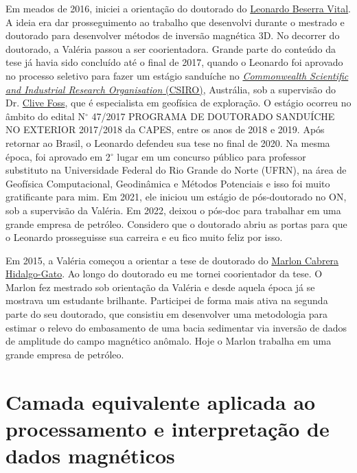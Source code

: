 Em meados de 2016, iniciei a orientação do doutorado do 
\href{https://lattes.cnpq.br/3155435296388448}{Leonardo Beserra Vital}.
A ideia era dar prosseguimento ao trabalho que desenvolvi durante o mestrado e doutorado
para desenvolver métodos de inversão magnética 3D.
No decorrer do doutorado, a Valéria passou a ser coorientadora.
Grande parte do conteúdo da tese já havia sido concluído até o final de 2017, quando
o Leonardo foi aprovado no processo seletivo para fazer um estágio sanduíche no 
\href{https://www.csiro.au/}{\textit{Commonwealth Scientific and Industrial Research Organisation} (CSIRO)}, Austrália, sob a supervisão do Dr.
\href{https://confluence.csiro.au/display/cmfr/CSIRO+Remanent+Magnetists}{Clive Foss}, 
que é especialista em geofísica de exploração. O estágio ocorreu no âmbito do edital
N$^{\circ}$ 47/2017 PROGRAMA DE DOUTORADO SANDUÍCHE NO EXTERIOR 2017/2018 da CAPES, 
entre os anos de 2018 e 2019. Após retornar ao Brasil, o Leonardo defendeu sua tese
no final de 2020. Na mesma época, foi aprovado em 2$^{\circ}$ lugar em um concurso 
público para
professor substituto na Universidade Federal do Rio Grande do Norte (UFRN), na área de
Geofísica Computacional, Geodinâmica e Métodos Potenciais e isso foi muito gratificante
para mim. Em 2021, ele iniciou um estágio de pós-doutorado no ON, sob a supervisão da
Valéria. Em 2022, deixou o pós-doc para trabalhar em uma grande empresa de petróleo.
Considero que o doutorado abriu as portas para que o Leonardo prosseguisse sua 
carreira e eu fico muito feliz por isso.

Em 2015, a Valéria começou a orientar a tese de doutorado do
\href{https://lattes.cnpq.br/4057248251995225}{Marlon Cabrera Hidalgo-Gato}.
Ao longo do doutorado eu me tornei coorientador da tese.
O Marlon fez mestrado sob orientação da Valéria e desde aquela época já se
mostrava um estudante brilhante. Participei de forma mais ativa na segunda parte do
seu doutorado, que consistiu em desenvolver uma metodologia para estimar o 
relevo do embasamento de uma bacia sedimentar via inversão de dados de amplitude
do campo magnético anômalo. Hoje o Marlon trabalha em uma grande empresa de petróleo.

\section{Camada equivalente aplicada ao processamento e interpretação de dados magnéticos} 
\label{sec:projeto-guarda-chuva-eqlayer}

